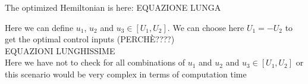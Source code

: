 The optimized Hemiltonian is here: EQUAZIONE LUNGA

Here we can define $u_{1}$, $u_{2}$ and $u_{3}\in[U_{1}, U_{2}]$. We can choose here $U_{1}=-U_{2}$ to get the optimal control inputs (PERCHÈ????)
\\
EQUAZIONI LUNGHISSIME
\\
Here we have not to check for all combinations of $u_{1}$ and $u_{2}$ and $u_{3}\in[U_{1},U_{2}]$ or this scenario would be very complex in terms of computation time

